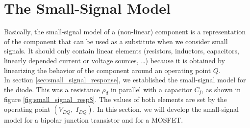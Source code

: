 \section{The Small-Signal Model}
\label{sec:small_signal_model}
Basically, the small-signal model of a (non-linear) component is a representation of the component that can be used as a substitute when we consider small signals. It should only contain linear elements (resistors, inductors, capacitors, linearly depended current or voltage sources, \ldots) because it is obtained by linearizing the behavior of the component around an operating point $Q$.\\
In section \ref{sec:small_signal_response}, we established the small-signal model for the diode. This was a resistance $\rho_d$ in parallel with a capacitor $C_j$, as shown in figure \ref{fig:small_signal_resp8}. The values of both elements are set by the operating point $(V_{DQ},\; I_{DQ})$. In this section, we will develop the small-signal model for a bipolar junction transistor and for a MOSFET.

